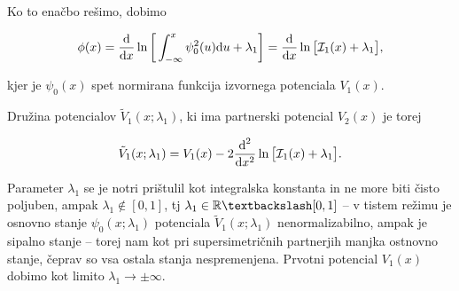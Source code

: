 Ko to ena\v cbo re\v simo, dobimo

\begin{equation}
	\phi(x) = \frac{\text{d}}{\text{d} x} \ln \bigg[\int_{-\infty}^x \psi_0^2(u)\text{d} u + \lambda_1\bigg] =
		\frac{\text{d}}{\text{d} x} \ln \big[\mathcal{I}_1(x) + \lambda_1\big],
\end{equation}

kjer je $\psi_0(x)$ spet normirana funkcija izvornega potenciala $V_1 (x)$.

Dru\v zina potencialov $\tilde{V}_1 (x; \lambda_1)$, ki ima partnerski potencial $V_2(x)$ je torej

\begin{equation}
	\tilde{V}_1 (x;\lambda_1) = V_1(x) - 2\frac{\text{d}^2}{\text{d} x^2}\ln\big[\mathcal{I}_1(x) + \lambda_1\big].
\end{equation}

Parameter $\lambda_1$ se je notri pri\v stulil kot integralska konstanta in ne more biti \v cisto poljuben, ampak
$\lambda_1 \notin [0,1]$, tj $\lambda_1 \in \mathbb{R}\textbackslash[0,1]$ -- v tistem re\v zimu je osnovno stanje
$\psi_0 (x; \lambda_1)$ potenciala $\tilde{V}_1(x; \lambda_1)$ nenormalizabilno, ampak je sipalno stanje -- torej
nam kot pri supersimetri\v cnih partnerjih manjka ostnovno stanje, \v ceprav so vsa ostala stanja nespremenjena.
Prvotni potencial $V_1(x)$ dobimo kot limito $\lambda_1 \to \pm \infty$.
